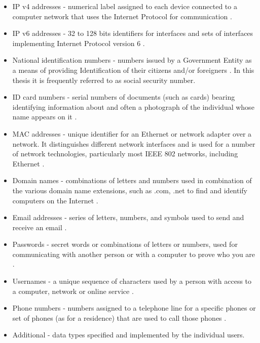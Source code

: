 \documentclass[a4paper,twoside,12pt]{book}
\begin{document}
\begin{itemize}
   \item IP v4 addresses - numerical label assigned to each device connected to a computer network that uses the Internet Protocol for communication \cite{bib:articleIP}.
   \item IP v6 addresses - 32 to 128 bits identifiers for interfaces and sets of interfaces implementing Internet Protocol version 6 \cite{bib:articleIPv6}\cite{bib:articleIPv6Address}. 
   \item National identification numbers - numbers issued by a Government Entity as a means of providing Identification of their citizens and/or foreigners \cite{bib:internetIdentityNumber}.
   In this thesis it is frequently referred to as social security number.
   \item ID card numbers - serial numbers of documents (such as cards) bearing identifying information about and often a photograph of the individual whose 
   name appears on it \cite{bib:internetID}. 
   \item MAC addresses - unique identifier for an Ethernet or network adapter over a network. It distinguishes different network interfaces and is used for a number 
   of network technologies, particularly most IEEE 802 networks, including Ethernet \cite{bib:internetMAC}.
   \item Domain names - combinations of letters and numbers used in combination of the various domain name extensions, such as .com, .net to find and 
   identify computers on the Internet \cite{bib:internetDomain}.
   \item Email addresses - series of letters, numbers, and symbols used to send and receive an email \cite{bib:internetEmail}.
   \item Passwords - secret words or combinations of letters or numbers, used for communicating with another person or with a computer to prove who you are \cite{bib:internetPassword}.
   \item Usernames - a unique sequence of characters used by a person with access to a computer, network or online service \cite{bib:internetUsername}.
   \item Phone numbers - numbers assigned to a telephone line for a specific phones or set of phones (as for a residence) that are used to call those phones \cite{bib:internetPhone}.
   \item Additional - data types specified and implemented by the individual users.
\end{itemize}
\end{document}
